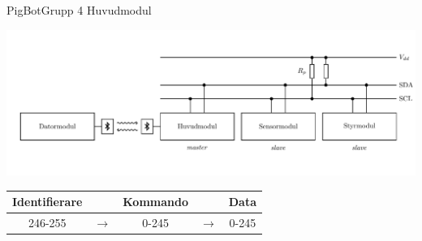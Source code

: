 \begin{frame}{PigBot}{Grupp 4}
  Huvudmodul
  \begin{center}
    \includegraphics[scale=0.5]{images/communication.pdf} 
    \pause
    \begin{longtable}{c c c c c}
      {Identifierare} & & {Kommando} & & {Data} \\ \hline
      246-255 & $\rightarrow$ & 0-245 & $\rightarrow$ & 0-245 
    \end{longtable}
  \end{center}
\end{frame}

